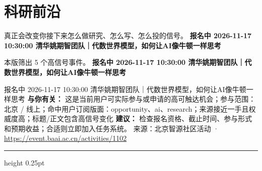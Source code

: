 \documentclass[10.5pt]{ctexart}
\begin{document}
\section*{科研前沿}
{\color{ormuted} 真正会改变你接下来怎么做研究、怎么写、怎么投的信号。}
\vspace{2mm}
{\LARGE\bfseries 报名中 2026-11-17 10:30:00 清华姚期智团队｜代数世界模型，如何让AI像牛顿一样思考}\par
\vspace{1mm}
{\color{ormuted} 本版筛出 5 个高信号事件。}
\vspace{3mm}
{\Large\bfseries 报名中 2026-11-17 10:30:00 清华姚期智团队｜代数世界模型，如何让AI像牛顿一样思考}\par
报名中 2026-11-17 10:30:00 清华姚期智团队｜代数世界模型，如何让AI像牛顿一样思考
\textbf{与你有关：} 这是当前用户可实际参与或申请的高可触达机会；参与范围：北京 / 线上；命中用户订阅版面：opportunity、ai、research；来源接近一手且权威度高；标题/正文包含高信号变化
\textbf{建议：} 检查报名资格、截止时间、参与形式和预期收益；合适则立即加入任务系统。
{\footnotesize\color{ormuted} 来源：北京智源社区活动 · \url{https://event.baai.ac.cn/activities/1102}}
\vspace{4mm}
\hrule height 0.25pt
\vspace{3mm}
\end{document}
